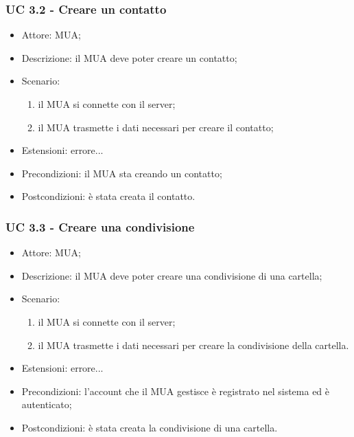     \subsubsection{UC 3.2 - Creare un contatto} \label{sec: UC 3.2}
    \begin{itemize}
        \item Attore: MUA;
        \item Descrizione: il MUA deve poter creare un contatto;
        \item Scenario:
        \begin{enumerate}
        \item il MUA si connette con il server;
        \item il MUA trasmette i dati necessari per creare il contatto;
        \end{enumerate}
        \item Estensioni: errore...
        \item Precondizioni: il MUA sta creando un contatto;
        \item Postcondizioni: è stata creata il contatto.
    \end{itemize}

    \subsubsection{UC 3.3 - Creare una condivisione} \label{sec: UC 3.3}
    \begin{itemize}
        \item Attore: MUA;
        \item Descrizione: il MUA deve poter creare una condivisione di una cartella;
        \item Scenario:
        \begin{enumerate}
        \item il MUA si connette con il server;
        \item il MUA trasmette i dati necessari per creare la condivisione della cartella.
        \end{enumerate}
        \item Estensioni: errore...
        \item Precondizioni: l’account che il MUA gestisce è registrato nel sistema ed è autenticato;
        \item Postcondizioni: è stata creata la condivisione di una cartella.
    \end{itemize}


